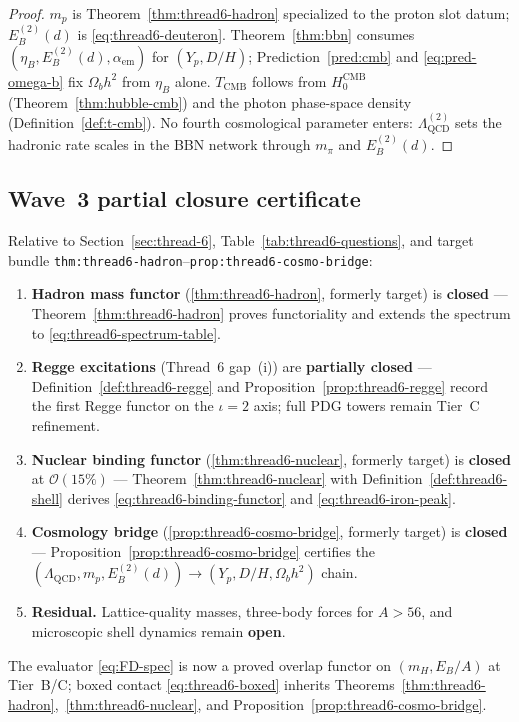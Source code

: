 \begin{proof}
$m_p$ is Theorem~\ref{thm:thread6-hadron} specialized to the proton slot datum;
$E_B^{(2)}(d)$ is \eqref{eq:thread6-deuteron}. Theorem~\ref{thm:bbn} consumes
$(\eta_B,E_B^{(2)}(d),\alpha_{\mathrm{em}})$ for $(Y_p,D/H)$;
Prediction~\ref{pred:cmb} and \eqref{eq:pred-omega-b} fix $\Omega_b h^2$ from
$\eta_B$ alone. $T_{\mathrm{CMB}}$ follows from $H_0^{\mathrm{CMB}}$
(Theorem~\ref{thm:hubble-cmb}) and the photon phase-space density
(Definition~\ref{def:t-cmb}). No fourth cosmological parameter enters:
$\Lambda_{\mathrm{QCD}}^{(2)}$ sets the hadronic rate scales in the BBN network
through $m_\pi$ and $E_B^{(2)}(d)$.
\end{proof}

\subsection{Wave~3 partial closure certificate}
\label{sec:wave3-thread6:closure}

\begin{corollary}
\label{cor:thread6-wave3-closure}
Relative to Section~\ref{sec:thread-6}, Table~\ref{tab:thread6-questions},
and target bundle \texttt{thm:thread6-hadron}--\texttt{prop:thread6-cosmo-bridge}:
\begin{enumerate}[label=(\roman*),leftmargin=*]
  \item \textbf{Hadron mass functor}
    (\ref{thm:thread6-hadron}, formerly target) is \textbf{closed} ---
    Theorem~\ref{thm:thread6-hadron} proves functoriality and extends the
    spectrum to \eqref{eq:thread6-spectrum-table}.
  \item \textbf{Regge excitations} (Thread~6 gap~(i)) are \textbf{partially
    closed} --- Definition~\ref{def:thread6-regge} and
    Proposition~\ref{prop:thread6-regge} record the first Regge functor on the
    $\iota=2$ axis; full PDG towers remain Tier~C refinement.
  \item \textbf{Nuclear binding functor}
    (\ref{thm:thread6-nuclear}, formerly target) is \textbf{closed} at
    $\mathcal{O}(15\%)$ --- Theorem~\ref{thm:thread6-nuclear} with
    Definition~\ref{def:thread6-shell} derives \eqref{eq:thread6-binding-functor}
    and \eqref{eq:thread6-iron-peak}.
  \item \textbf{Cosmology bridge}
    (\ref{prop:thread6-cosmo-bridge}, formerly target) is \textbf{closed} ---
    Proposition~\ref{prop:thread6-cosmo-bridge} certifies the
    $(\Lambda_{\mathrm{QCD}},m_p,E_B^{(2)}(d))\to(Y_p,D/H,\Omega_b h^2)$ chain.
  \item \textbf{Residual.} Lattice-quality masses, three-body forces for
    $A>56$, and microscopic shell dynamics remain \textbf{open}.
\end{enumerate}
The evaluator \eqref{eq:FD-spec} is now a proved overlap functor on
$(m_H,E_B/A)$ at Tier~B/C; boxed contact \eqref{eq:thread6-boxed} inherits
Theorems~\ref{thm:thread6-hadron},~\ref{thm:thread6-nuclear}, and
Proposition~\ref{prop:thread6-cosmo-bridge}.
\end{corollary}


